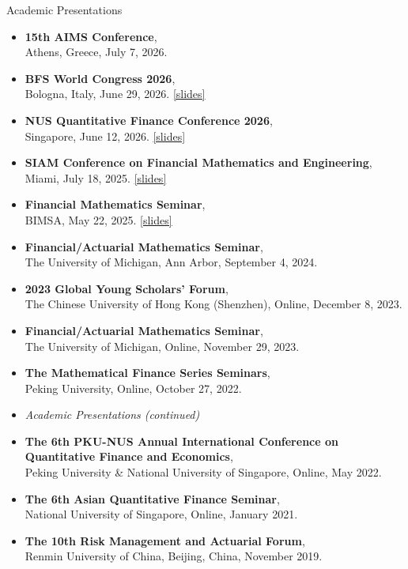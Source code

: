 \documentclass[
	11pt, %
]{resume} %
\begin{document}
\begin{rSection}{Academic Presentations}
    \begin{itemize}
        \item \textbf{15th AIMS Conference}, \\
        Athens, Greece, July 7, 2026.
        \item \textbf{BFS World Congress 2026}, \\
        Bologna, Italy, June 29, 2026. \href{https://fy-yuan.github.io/assets/BFS-Fengyi.pdf}{[slides]}
        \item \textbf{NUS Quantitative Finance Conference 2026}, \\
        Singapore, June 12, 2026. \href{https://fy-yuan.github.io/assets/diffusion_mv_theory_slides.pdf}{[slides]}
        \item \textbf{SIAM Conference on Financial Mathematics and Engineering}, \\
        Miami, July 18, 2025. \href{https://fy-yuan.github.io/assets/Fengyi-SIFIN2025.pdf}{[slides]}
        \item \textbf{Financial Mathematics Seminar}, \\
        BIMSA, May 22, 2025. \href{https://fy-yuan.github.io/assets/BIMSA.pdf}{[slides]}
        \item \textbf{Financial/Actuarial Mathematics Seminar}, \\
        The University of Michigan, Ann Arbor, September 4, 2024.
        \item \textbf{2023 Global Young Scholars' Forum}, \\
        The Chinese University of Hong Kong (Shenzhen), Online, December 8, 2023.
        \item \textbf{Financial/Actuarial Mathematics Seminar}, \\
        The University of Michigan, Online, November 29, 2023.
        \item \textbf{The Mathematical Finance Series Seminars}, \\
        Peking University, Online, October 27, 2022.
        \pagebreak
        \item[] \textit{Academic Presentations (continued)}
        \item \textbf{The 6th PKU-NUS Annual International Conference on Quantitative Finance and Economics}, \\
        Peking University \& National University of Singapore, Online, May 2022.
        \item \textbf{The 6th Asian Quantitative Finance Seminar}, \\
        National University of Singapore, Online, January 2021.
        \item \textbf{The 10th Risk Management and Actuarial Forum}, \\
        Renmin University of China, Beijing, China, November 2019.
    \end{itemize}
\end{rSection}
\end{document}
